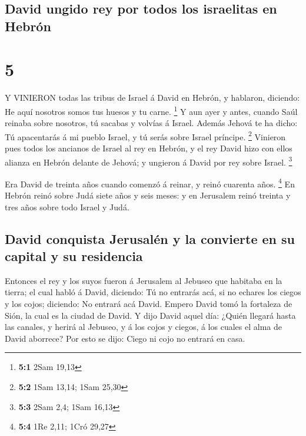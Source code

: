 \hypertarget{david-ungido-rey-por-todos-los-israelitas-en-hebruxf3n}{%
\subsection{David ungido rey por todos los israelitas en
Hebrón}\label{david-ungido-rey-por-todos-los-israelitas-en-hebruxf3n}}

\hypertarget{section-4}{%
\section{5}\label{section-4}}

 Y VINIERON todas las tribus de Israel á David en Hebrón, y
hablaron, diciendo: He aquí nosotros somos tus huesos y tu carne.
\footnote{\textbf{5:1} 2Sam 19,13}  Y aun ayer y antes,
cuando Saúl reinaba sobre nosotros, tú sacabas y volvías á Israel.
Además Jehová te ha dicho: Tú apacentarás á mi pueblo Israel, y tú serás
sobre Israel príncipe. \footnote{\textbf{5:2} 1Sam 13,14; 1Sam 25,30}
 Vinieron pues todos los ancianos de Israel al rey en
Hebrón, y el rey David hizo con ellos alianza en Hebrón delante de
Jehová; y ungieron á David por rey sobre Israel. \footnote{\textbf{5:3}
  2Sam 2,4; 1Sam 16,13}

 Era David de treinta años cuando comenzó á reinar, y reinó
cuarenta años. \footnote{\textbf{5:4} 1Re 2,11; 1Cró 29,27} 
En Hebrón reinó sobre Judá siete años y seis meses: y en Jerusalem reinó
treinta y tres años sobre todo Israel y Judá.

\hypertarget{david-conquista-jerusaluxe9n-y-la-convierte-en-su-capital-y-su-residencia}{%
\subsection{David conquista Jerusalén y la convierte en su capital y su
residencia}\label{david-conquista-jerusaluxe9n-y-la-convierte-en-su-capital-y-su-residencia}}

 Entonces el rey y los suyos fueron á Jerusalem al Jebuseo
que habitaba en la tierra; el cual habló á David, diciendo: Tú no
entrarás acá, si no echares los ciegos y los cojos; diciendo: No entrará
acá David.  Empero David tomó la fortaleza de Sión, la cual
es la ciudad de David.  Y dijo David aquel día: ¿Quién
llegará hasta las canales, y herirá al Jebuseo, y á los cojos y ciegos,
á los cuales el alma de David aborrece? Por esto se dijo: Ciego ni cojo
no entrará en casa.

